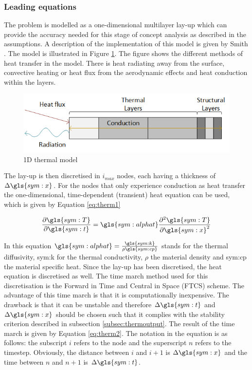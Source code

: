 \subsubsection{Leading equations}
The problem is modelled as a one-dimensional multilayer lay-up which can provide the accuracy needed for this stage of concept analysis as described in the assumptions. A description of the implementation of this model is given by Smith \cite{Smith2011}. The model is illustrated in Figure \ref{fig:1dthermal}. The figure shows the different methods of heat transfer in the model. There is heat radiating away from the surface, convective heating or heat flux from the aerodynamic effects and heat conduction within the layers.

\begin{figure}[H]
	\centering
	\includegraphics{Figure/1dthermal.png}
	\caption{1D thermal model}
	\label{fig:1dthermal}
\end{figure}

The lay-up is then discretised in $i_{max}$ nodes, each having a thickness of $\Delta \gls{sym:x}$. For the nodes that only experience conduction as heat transfer the one-dimensional, time-dependent (transient) heat equation can be used, which is given by Equation \eqref{eq:therm1}

\begin{equation}
\frac{\partial \gls{sym:T}}{\partial \gls{sym:t}} = \gls{sym:alphat}\frac{\partial^2\gls{sym:T}}{\partial \gls{sym:x}^2}
\label{eq:therm1}
\end{equation}

In this equation $\gls{sym:alphat}=\frac{\gls{sym:k}}{\rho \gls{sym:cp}}$ stands for the thermal diffusivity, \gls{sym:k} for the thermal conductivity, $\rho$ the material density and \gls{sym:cp} the material specific heat. Since the lay-up has been discretised, the heat equation is discretised as well. The time march method used for this discretisation is the Forward in Time and Central in Space (FTCS) scheme. The advantage of this time march is that it is computationally inexpensive. The drawback is that it can be unstable and therefore $\Delta \gls{sym:t}$ and $\Delta \gls{sym:x}$ should be chosen such that it complies with the stability criterion described in subsection \ref{subsec:thermoutput}. The result of the time march is given by Equation \eqref{eq:therm2}. The notation in the equation is as follows: the subscript $i$ refers to the node and the superscript $n$ refers to the timestep. Obviously, the distance between $i$ and $i+1$ is $\Delta \gls{sym:x}$ and the time between $n$ and $n+1$ is $\Delta \gls{sym:t}$.

